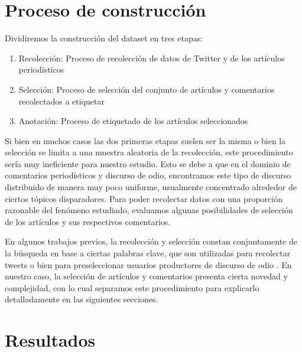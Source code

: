 \section{Proceso de construcción}

Dividiremos la construcción del dataset en tres etapas:

\begin{enumerate}
    \item Recolección: Proceso de recolección de datos de Twitter y de los artículos periodísticos
    \item Selección: Proceso de selección del conjunto de artículos y comentarios recolectados a etiquetar
    \item Anotación: Proceso de etiquetado de los artículos seleccionados
\end{enumerate}

Si bien en muchos casos las dos primeras etapas suelen ser la misma o bien la selección se limita a una muestra aleatoria de la recolección, este procedimiento sería muy ineficiente para nuestro estudio. Esto se debe a que en el dominio de comentarios periodísticos y discurso de odio, encontramos este tipo de discurso distribuido de manera muy poco uniforme, usualmente concentrado alrededor de ciertos tópicos disparadores. Para poder recolectar datos con una proporción razonable del fenómeno estudiado, evaluamos algunas posibilidades de selección de los artículos y sus respectivos comentarios.

En algunos trabajos previos, la recolección y selección constan conjuntamente de la búsqueda en base a ciertas palabras clave, que son utilizadas para recolectar tweets o bien para preseleccionar usuarios productores de discurso de odio \cite{waseem2016hateful,hateval2019semeval}. En nuestro caso, la selección de artículos y comentarios presenta cierta novedad y complejidad, con lo cual separamos este procedimiento para explicarlo detalladamente en las siguientes secciones.





\section{Resultados}

